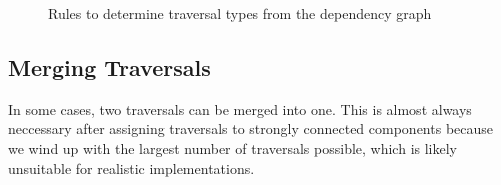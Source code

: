 \documentclass[10pt]{article}
\begin{document}
\begin{figure}
        \begin{prooftree}
        \end{prooftree}
        \begin{prooftree}
        \end{prooftree}
        \begin{prooftree}
        \end{prooftree}
        \begin{prooftree}
        \end{prooftree}
        \begin{prooftree}
        \end{prooftree}
        \begin{prooftree}
        \end{prooftree}
        \begin{prooftree}
        \end{prooftree}
        \caption{Rules to determine traversal types from the dependency graph}
        \label{fig:logic}
    \end{figure}

    \subsection{Merging Traversals}
    In some cases, two traversals can be merged into one. This is almost always neccessary after assigning traversals to strongly connected components because we wind up with the largest number of traversals possible, which is likely unsuitable for realistic implementations.
\end{document}
